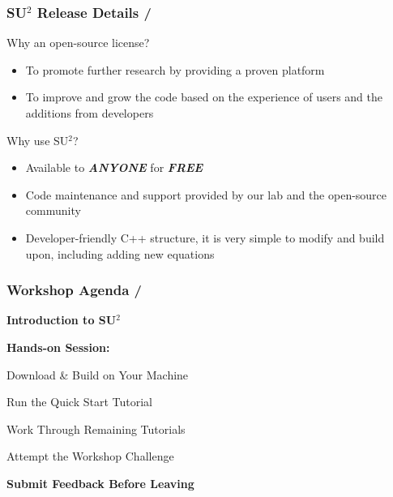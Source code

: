 \documentclass[handout,table]{beamer}
\begin{document}
\begin{frame}[t]
\frametitle{ SU$^2$ Release Details \hfill  \small{ \insertframenumber/\inserttotalframenumber} }

Why an open-source license?

\begin{itemize}
\item To \textcolor{cardinal}{promote further research} by providing a proven platform
\item To \textcolor{cardinal}{improve and grow the code} based on the experience of users and the additions from developers
\end{itemize}

\pause

Why use SU$^2$?

\begin{itemize}
\item \textcolor{cardinal}{Available to {\it \bf ANYONE} for {\it \bf FREE }}
\item \textcolor{cardinal}{Code maintenance and support} provided by our lab and the open-source community
\item \textcolor{cardinal}{Developer-friendly C++ structure}, it is very simple to modify and build upon, including adding new equations
\end{itemize}

\end{frame}

\begin{frame}[t]
\frametitle{Workshop Agenda \hfill  \small{ \insertframenumber/\inserttotalframenumber} }

{\center

{\bf Introduction to SU$^2$}

\vspace{0.3in}

{\bf Hands-on Session: }

\vspace{0.05in}

{ Download \& Build on Your Machine}

\vspace{0.05in}

Run the Quick Start Tutorial

\vspace{0.05in}

Work Through Remaining Tutorials

\vspace{0.05in}

Attempt the Workshop Challenge

\vspace{0.3in}

{\bf Submit Feedback Before Leaving }

}


\end{frame}
\end{document}
